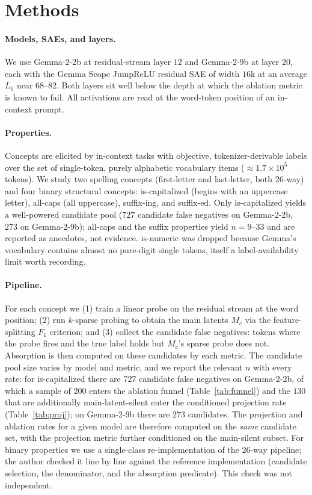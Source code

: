 \documentclass[11pt]{article}
\newcommand{\iscap}{\textsf{is-capitalized}}
\newcommand{\allcaps}{\textsf{all-caps}}
\newcommand{\suffing}{\textsf{suffix-ing}}
\newcommand{\suffed}{\textsf{suffix-ed}}
\theoremstyle{definition}
\begin{document}
\section{Methods}\label{sec:methods}
\paragraph{Models, SAEs, and layers.}
We use Gemma-2-2b at residual-stream layer $12$ and Gemma-2-9b at layer $20$, each with the Gemma Scope
JumpReLU residual SAE of width $16$k at an average $L_0$ near $68$--$82$. Both layers sit well below the
depth at which the ablation metric is known to fail. All activations are read at the word-token position of
an in-context prompt.

\paragraph{Properties.}
Concepts are elicited by in-context tasks with objective, tokenizer-derivable labels over the set of
single-token, purely alphabetic vocabulary items ($\approx 1.7\times10^5$ tokens). We study two spelling
concepts (first-letter and last-letter, both 26-way) and four binary structural concepts: \iscap{} (begins
with an uppercase letter), \allcaps{} (all uppercase), \suffing{}, and \suffed{}. Only \iscap{} yields a
well-powered candidate pool ($727$ candidate false negatives on Gemma-2-2b, $273$ on Gemma-2-9b);
\allcaps{} and the suffix properties yield $n{=}9$--$33$ and are reported as anecdotes, not evidence. \textsf{is-numeric} was dropped because Gemma's vocabulary contains
almost no pure-digit single tokens, itself a label-availability limit worth recording.

\paragraph{Pipeline.}
For each concept we (1) train a linear probe on the residual stream at the word position; (2) run $k$-sparse
probing to obtain the main latents $M_c$ via the feature-splitting $F_1$ criterion; and (3) collect the
candidate false negatives: tokens where the probe fires and the true label holds but $M_c$'s sparse probe
does not. Absorption is then computed on these candidates by each metric. The candidate pool size varies by
model and metric, and we report the relevant $n$ with every rate: for \iscap{} there are $727$ candidate
false negatives on Gemma-2-2b, of which a sample of $200$ enters the ablation funnel
(Table~\ref{tab:funnel}) and the $130$ that are additionally main-latent-silent enter the conditioned
projection rate (Table~\ref{tab:proj}); on Gemma-2-9b there are $273$ candidates. The projection and
ablation rates for a given model are therefore computed on the \emph{same} candidate set, with the
projection metric further conditioned on the main-silent subset. For binary properties we use a
single-class re-implementation of the 26-way pipeline; the author checked it line by line against the
reference implementation (candidate selection, the denominator, and the absorption predicate). This
check was not independent.
\end{document}
